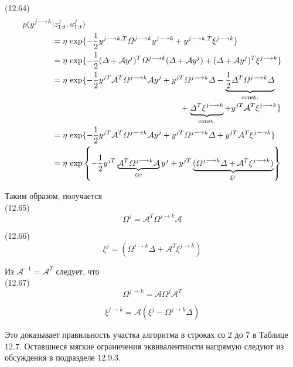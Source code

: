 \documentclass[10pt,a4paper]{article}
\begin{document}
(12.64)
\begin{equation*}
\begin{split}
p(y^{j\longrightarrow k}&|z_{1:t}^j,u_{1:t}^j)\\
&=\eta\,\exp\{-\frac{1}{2}y^{j\longrightarrow k,T}\varOmega^{j\longrightarrow k}y^{j\longrightarrow k}+y^{j\longrightarrow k,T}\xi^{j\longrightarrow k}\}\\
&=\eta\,\exp\{-\frac{1}{2}(\varDelta+\mathcal{A}y^j)^T\varOmega^{j\longrightarrow k}(\varDelta+\mathcal{A}y^j)+(\varDelta+\mathcal{A}y^j)^T\xi^{j\longrightarrow k}\}\\
&=\eta\,\exp\{ -\frac{1}{2}y^{jT}\mathcal{A}^T\varOmega^{j\longrightarrow k}\mathcal{A}y^j+y^{jT}\varOmega^{j\longrightarrow k}\varDelta-\underbrace{\frac{1}{2}\varDelta^T\varOmega^{j\longrightarrow k}\varDelta}_{\text{const.}}\\
&\hspace{55mm}+\underbrace{\varDelta^T\xi^{j\longrightarrow k}}_{\text{const.}}+y^{jT}\mathcal{A}^T\xi^{j\longrightarrow k}\} \\
&=\eta\,\exp\{-\frac{1}{2}y^{jT}\mathcal{A}^T\varOmega^{j\longrightarrow k}\mathcal{A}y^j+y^{jT}\varOmega^{j\longrightarrow k}\varDelta+y^{jT}\mathcal{A}^T\xi^{j\longrightarrow k}\}\\
&=\eta\,\exp\left\lbrace -\frac{1}{2}y^{jT}\underbrace{\mathcal{A}^T\varOmega^{j\longrightarrow k}\mathcal{A}}_{\varOmega^j}y^j+y^{jT}\underbrace{(\varOmega^{j\longrightarrow k}\varDelta+\mathcal{A}^T\xi^{j\longrightarrow k})}_{\xi^j}\right\rbrace 
\end{split}
\end{equation*}

Таким образом, получается\\

(12.65)
$$\varOmega^j=\mathcal{A}^T\varOmega^{j\longrightarrow k}\mathcal{A}$$

(12.66)
$$\xi^j=(\varOmega^{j\longrightarrow k}\varDelta+\mathcal{A}^T\xi^{j\longrightarrow k})$$

Из $\mathcal{A}^{-1}=\mathcal{A}^T$ следует, что\\

(12.67)
$$\varOmega^{j\longrightarrow k}=\mathcal{A}\varOmega^j\mathcal{A}^T$$

$$\xi^{j\longrightarrow k}=\mathcal{A}(\xi^j-\varOmega^{j\longrightarrow k}\varDelta)$$

Это доказывает правильность участка алгоритма в строках со 2 до 7 в Таблице 12.7. Оставшиеся мягкие ограничения эквивалентности напрямую следуют из обсуждения в подразделе 12.9.3. \\
\end{document}
